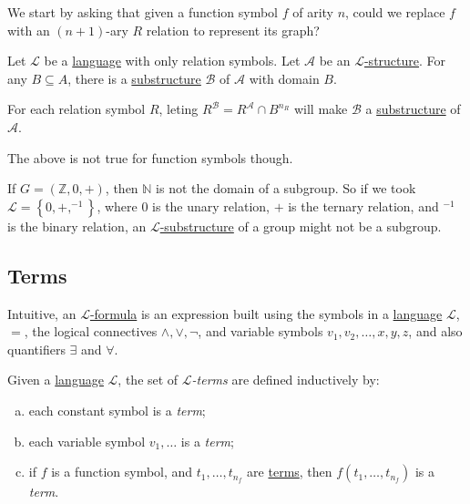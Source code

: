 We start by asking that given a function symbol \(f\) of arity \(n\), could we replace \(f\) with an \((n+1)\)-ary \(R\) relation to represent its graph?

\begin{eg}
	Let \(\mathcal{L} \) be a \hyperref[def:language]{language} with only relation symbols. Let \(\mathcal{A} \) be an \hyperref[def:structure]{\(\mathcal{L} \)-structure}. For any \(B \subseteq A\), there is a \hyperref[def:substructure]{substructure} \(\mathcal{B} \) of \(\mathcal{A} \) with domain \(B\).
\end{eg}
\begin{explanation}
	For each relation symbol \(R\), leting \(R^{\mathcal{B} } =R^{\mathcal{A} }  \cap B^{n_R}\) will make \(\mathcal{B} \) a \hyperref[def:substructure]{substructure} of \(\mathcal{A} \).
\end{explanation}

The above is not true for function symbols though.

\begin{eg}
	If \(G=(\mathbb{Z} , 0, +)\), then \(\mathbb{N} \) is not the domain of a subgroup. So if we took \(\mathcal{L} =\left\{ 0, +, ^{-1}  \right\} \), where \(0\) is the unary relation, \(+\) is the ternary relation, and \(^{-1} \) is the binary relation, an \hyperref[def:substructure]{\(\mathcal{L} \)-substructure} of a group might not be a subgroup.
\end{eg}

\subsection{Terms}
Intuitive, an \hyperref[def:formula]{\(\mathcal{L} \)-formula} is an expression built using the symbols in a \hyperref[def:language]{language} \(\mathcal{L} \), \(=\), the logical connectives \(\land, \lor, \lnot\), and variable symbols \(v_1, v_2, \ldots , x, y, z\), and also quantifiers \(\exists \) and \(\forall \).

\begin{definition}[Term]\label{def:term}
	Given a \hyperref[def:language]{language} \(\mathcal{L} \), the set of \emph{\(\mathcal{L} \)-terms} are defined inductively by:
	\begin{enumerate}[(a)]
		\item each constant symbol is a \emph{term};
		\item each variable symbol \(v_1, \ldots \) is a \emph{term};
		\item if \(f\) is a function symbol, and \(t_1, \ldots , t_{n_f}\) are \hyperref[def:term]{terms}, then \(f(t_1, \ldots , t_{n_f})\) is a \emph{term}.
	\end{enumerate}
\end{definition}

